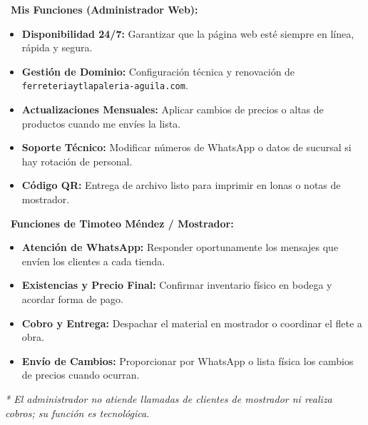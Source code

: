 \documentclass[10pt,letterpaper]{article}
\begin{document}
\begin{minipage}[t]{0.48\textwidth}
    \textbf{\color{NavyBlue}\faLaptopCode\ Mis Funciones (Administrador Web):}
    \begin{itemize}[leftmargin=*,itemsep=2.5pt,label={\color{EmeraldGreen}\faCheckCircle}]
        \item \textbf{Disponibilidad 24/7:} Garantizar que la página web esté siempre en línea, rápida y segura.
        \item \textbf{Gestión de Dominio:} Configuración técnica y renovación de \texttt{ferreteriaytlapaleria-aguila.com}.
        \item \textbf{Actualizaciones Mensuales:} Aplicar cambios de precios o altas de productos cuando me envíes la lista.
        \item \textbf{Soporte Técnico:} Modificar números de WhatsApp o datos de sucursal si hay rotación de personal.
        \item \textbf{Código QR:} Entrega de archivo listo para imprimir en lonas o notas de mostrador.
    \end{itemize}
\end{minipage}
\hfill
\begin{minipage}[t]{0.48\textwidth}
    \textbf{\color{NavyBlue}\faStore\ Funciones de Timoteo Méndez / Mostrador:}
    \begin{itemize}[leftmargin=*,itemsep=2.5pt,label={\color{DarkAmber}\faCheck}]
        \item \textbf{Atención de WhatsApp:} Responder oportunamente los mensajes que envíen los clientes a cada tienda.
        \item \textbf{Existencias y Precio Final:} Confirmar inventario físico en bodega y acordar forma de pago.
        \item \textbf{Cobro y Entrega:} Despachar el material en mostrador o coordinar el flete a obra.
        \item \textbf{Envío de Cambios:} Proporcionar por WhatsApp o lista física los cambios de precios cuando ocurran.
    \end{itemize}
    \vspace{2pt}
    {\footnotesize\color{TextMuted}\textit{* El administrador no atiende llamadas de clientes de mostrador ni realiza cobros; su función es tecnológica.}}
\end{minipage}

\vspace{0.2cm}

\end{document}
